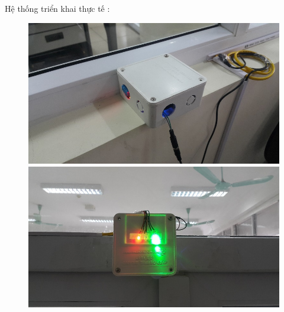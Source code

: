 Hệ thống triển khai thực tế :\\

\begin{figure}[h!]
	\center
	\includegraphics[scale=1]{image/hop_1}
	\includegraphics[scale=1]{image/hop_2}
\end{figure}

